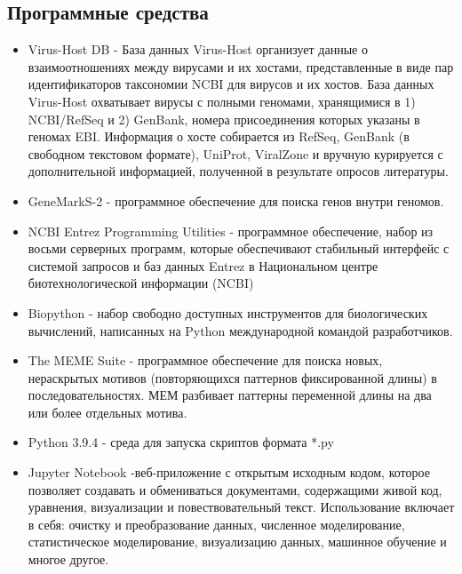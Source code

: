 \documentclass[a4paper,12pt]{article}
\begin{document}
\subsection{Программные средства}
\begin{itemize}
    \item Virus-Host DB - База данных Virus-Host организует данные о взаимоотношениях между вирусами и их хостами,
    представленные в виде пар идентификаторов таксономии NCBI для вирусов и их хостов. База данных Virus-Host охватывает
    вирусы с полными геномами, хранящимися в 1) NCBI/RefSeq и 2) GenBank, номера присоединения которых указаны в геномах
    EBI. Информация о хосте собирается из RefSeq, GenBank (в свободном текстовом формате), UniProt, ViralZone и вручную
    курируется с дополнительной информацией, полученной в результате опросов литературы. \cite{virus-host}
    
    \item GeneMarkS-2 - программное обеспечение для поиска генов внутри геномов. \cite{lomsad}
    
    \item NCBI Entrez Programming Utilities - программное обеспечение, набор из восьми серверных программ, которые
    обеспечивают стабильный интерфейс с системой запросов и баз данных Entrez в Национальном центре биотехнологической
    информации (NCBI) \cite{entrez}
    
    \item Biopython - набор свободно доступных инструментов для биологических вычислений, написанных на Python
    международной командой разработчиков. \cite{biopython}
    
    \item The MEME Suite - программное обеспечение для поиска новых, нераскрытых мотивов (повторяющихся паттернов
    фиксированной длины) в последовательностях. МЕМ разбивает паттерны переменной длины на два или более отдельных
    мотива. \cite{bailey}
    
    \item Python 3.9.4 - среда для запуска скриптов формата *.py \cite{python}
    
    \item Jupyter Notebook -веб-приложение с открытым исходным кодом, которое позволяет создавать и обмениваться
    документами, содержащими живой код, уравнения, визуализации и повествовательный текст. Использование включает в себя:
    очистку и преобразование данных, численное моделирование, статистическое моделирование, визуализацию данных, машинное
    обучение и многое другое. \cite{jupyter}
    

\end{itemize}
\end{document}
